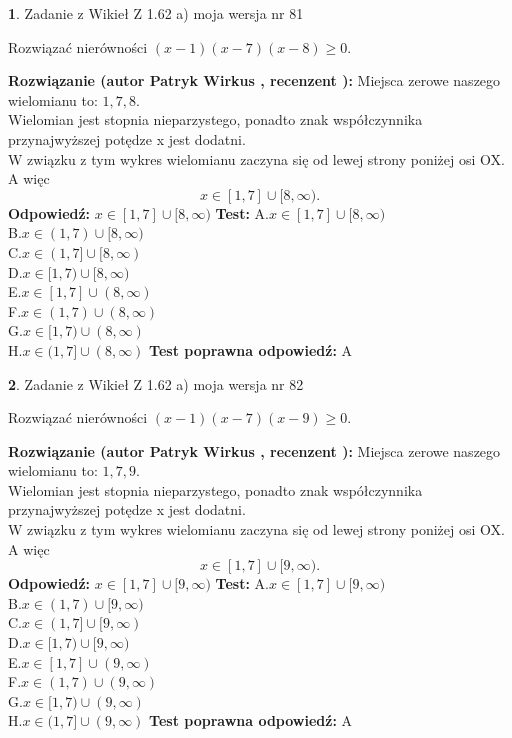 \documentclass[12pt, a4paper]{article}
\theoremstyle{definition} %
\newtheorem{zad}{}
\newcommand{\zadStart}[1]{\begin{zad}#1\newline}
\newcommand{\zadStop}{\end{zad}}
\newcommand{\rozwStart}[2]{\noindent \textbf{Rozwiązanie (autor #1 , recenzent #2): }\newline}
\newcommand{\rozwStop}{\newline}
\newcommand{\odpStart}{\noindent \textbf{Odpowiedź:}\newline}
\newcommand{\odpStop}{\newline}
\newcommand{\testStart}{\noindent \textbf{Test:}\newline}
\newcommand{\testStop}{\newline}
\newcommand{\kluczStart}{\noindent \textbf{Test poprawna odpowiedź:}\newline}
\newcommand{\kluczStop}{\newline}
\begin{document}
\zadStart{Zadanie z Wikieł Z 1.62 a) moja wersja nr 81}

Rozwiązać nierówności $(x-1)(x-7)(x-8)\ge0$.
\zadStop
\rozwStart{Patryk Wirkus}{}
Miejsca zerowe naszego wielomianu to: $1, 7, 8$.\\
Wielomian jest stopnia nieparzystego, ponadto znak współczynnika przy\linebreak najwyższej potędze x jest dodatni.\\ W związku z tym wykres wielomianu zaczyna się od lewej strony poniżej osi OX. A więc $$x \in [1,7] \cup [8,\infty).$$
\rozwStop
\odpStart
$x \in [1,7] \cup [8,\infty)$
\odpStop
\testStart
A.$x \in [1,7] \cup [8,\infty)$\\
B.$x \in (1,7) \cup [8,\infty)$\\
C.$x \in (1,7] \cup [8,\infty)$\\
D.$x \in [1,7) \cup [8,\infty)$\\
E.$x \in [1,7] \cup (8,\infty)$\\
F.$x \in (1,7) \cup (8,\infty)$\\
G.$x \in [1,7) \cup (8,\infty)$\\
H.$x \in (1,7] \cup (8,\infty)$
\testStop
\kluczStart
A
\kluczStop



\zadStart{Zadanie z Wikieł Z 1.62 a) moja wersja nr 82}

Rozwiązać nierówności $(x-1)(x-7)(x-9)\ge0$.
\zadStop
\rozwStart{Patryk Wirkus}{}
Miejsca zerowe naszego wielomianu to: $1, 7, 9$.\\
Wielomian jest stopnia nieparzystego, ponadto znak współczynnika przy\linebreak najwyższej potędze x jest dodatni.\\ W związku z tym wykres wielomianu zaczyna się od lewej strony poniżej osi OX. A więc $$x \in [1,7] \cup [9,\infty).$$
\rozwStop
\odpStart
$x \in [1,7] \cup [9,\infty)$
\odpStop
\testStart
A.$x \in [1,7] \cup [9,\infty)$\\
B.$x \in (1,7) \cup [9,\infty)$\\
C.$x \in (1,7] \cup [9,\infty)$\\
D.$x \in [1,7) \cup [9,\infty)$\\
E.$x \in [1,7] \cup (9,\infty)$\\
F.$x \in (1,7) \cup (9,\infty)$\\
G.$x \in [1,7) \cup (9,\infty)$\\
H.$x \in (1,7] \cup (9,\infty)$
\testStop
\kluczStart
A
\kluczStop
\end{document}
